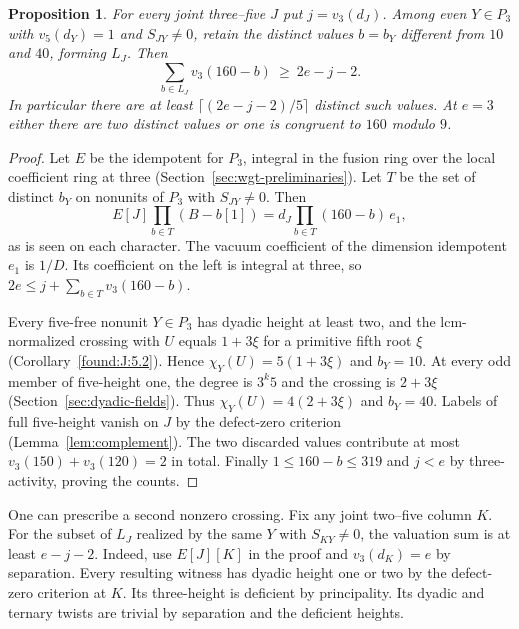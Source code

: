 \documentclass[11pt,a4paper]{article}
\numberwithin{equation}{section}
\newtheorem{proposition}[theorem]{Proposition}
\theoremstyle{remark}
\begin{document}
\begin{proposition}\label{found:P:4.1}
For every joint three--five $J$ put $j=v_3(d_J)$. Among even
$Y\in P_3$ with $v_5(d_Y)=1$ and $S_{JY}\ne0$, retain the distinct
values $b=b_Y$ different from $10$ and $40$, forming $L_J$. Then
\[
             \sum_{b\in L_J} v_3(160-b)\ \ge\ 2e-j-2 .
\]
In particular there are at least
$\lceil(2e-j-2)/5\rceil$ distinct such values. At $e=3$ either
there are two distinct values or one is congruent to $160$ modulo $9$.
\end{proposition}
\begin{proof}
Let $E$ be the idempotent for $P_3$, integral in the fusion ring
over the local coefficient ring at three (Section~\ref{sec:wgt-preliminaries}). Let $T$
be the set of distinct $b_Y$ on nonunits of $P_3$ with $S_{JY}\ne0$.
Then
\[
  E[J]\prod_{b\in T}(B-b[1])
      = d_J\prod_{b\in T}(160-b)\,e_1 ,
\]
as is seen on each character. The vacuum coefficient of the dimension
idempotent $e_1$ is $1/D$. Its coefficient on the left is integral at
three, so $2e\le j+\sum_{b\in T}v_3(160-b)$.

Every five-free nonunit $Y\in P_3$ has dyadic height at least two,
and the lcm-normalized crossing with $U$ equals $1+3\xi$ for a primitive fifth root $\xi$ (Corollary~\ref{found:J:5.2}). Hence
$\chi_Y(U)=5(1+3\xi)$ and $b_Y=10$. At every odd member of
five-height one, the degree is $3^k5$ and the crossing is $2+3\xi$ (Section~\ref{sec:dyadic-fields}). Thus
$\chi_Y(U)=4(2+3\xi)$ and $b_Y=40$. Labels of full five-height
vanish on $J$ by the defect-zero criterion (Lemma~\ref{lem:complement}).
The two discarded values contribute at most
$v_3(150)+v_3(120)=2$ in total. Finally $1\le 160-b\le319$
and $j<e$ by three-activity, proving the counts.
\end{proof}

One can prescribe a second nonzero crossing. Fix any joint two--five
column $K$. For the subset of $L_J$ realized by the same $Y$ with
$S_{KY}\ne0$, the valuation sum is at least $e-j-2$. Indeed, use
$E[J][K]$ in the proof and $v_3(d_K)=e$ by separation.
Every resulting witness has dyadic height one or two by the
defect-zero criterion at $K$. Its three-height is deficient by
principality. Its dyadic and ternary twists are trivial by separation and the deficient heights.
\end{document}
